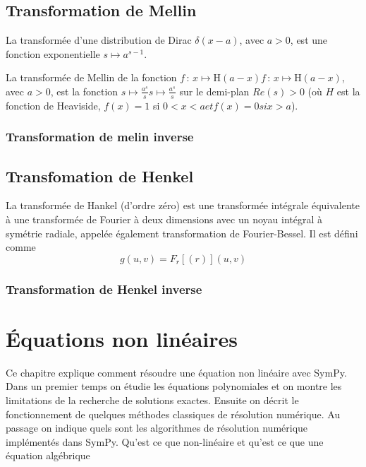  \section{Transformation de Mellin}
 \begin{example}
  La transformée d'une distribution de Dirac ${\displaystyle \delta (x-a)}$, avec $a > 0$, est une fonction exponentielle ${\displaystyle s\mapsto a^{s-1}}$.
 \end{example}
 \begin{python}
 \end{python}
 \begin{example}
  La transformée de Mellin de la fonction ${\displaystyle f\,:\,x\mapsto \mathrm {H} (a-x)} {\displaystyle f\,:\,x\mapsto \mathrm {H} (a-x)}$, avec $a > 0$, est la fonction ${\displaystyle s\mapsto {\frac {a^{s}}{s}}} {\displaystyle s\mapsto {\frac {a^{s}}{s}}}$ sur le demi-plan $Re (s) > 0$
(où $H$ est la fonction de Heaviside, $f(x) = 1$ si $0 < x < a et f (x) = 0 si x > a$).
 \end{example}
 \begin{python}
 \end{python}
 \begin{example}
 \end{example}
 \begin{python}
 \end{python}
 \subsection{Transformation de melin inverse}
 \section{Transfomation de Henkel}
 La transformée de Hankel (d'ordre zéro) est une transformée intégrale équivalente à une transformée de Fourier à deux dimensions avec un noyau intégral à symétrie radiale, appelée également transformation de Fourier-Bessel. Il est défini comme
 \[
 g \left(u, v \right)	= F_{r}\left[\left(r\right)\right]\left(u, v\right)
 \]
 \subsection{Transformation de Henkel inverse}
 
\chapter{Équations non linéaires}
Ce chapitre explique comment résoudre une équation non linéaire avec SymPy.
Dans un premier temps on étudie les équations polynomiales et on montre les
limitations de la recherche de solutions exactes. Ensuite on décrit le fonctionnement
de quelques méthodes classiques de résolution numérique. Au passage on indique
quels sont les algorithmes de résolution numérique implémentés dans SymPy.
Qu'est ce que non-linéaire et qu'est ce que une \'equation alg\'ebrique

